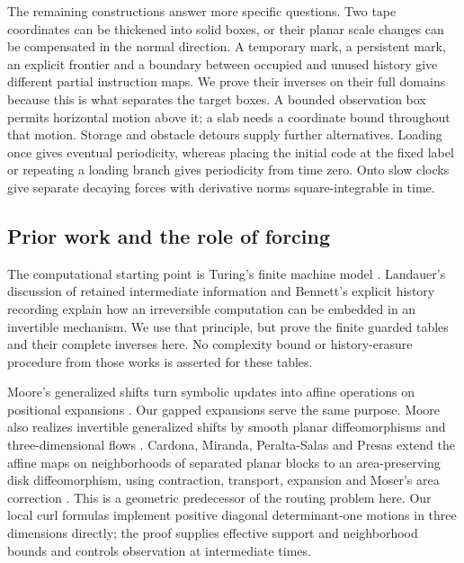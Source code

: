 The remaining constructions answer more specific questions. Two tape
coordinates can be thickened into solid boxes, or their planar scale changes
can be compensated in the normal direction. A temporary mark, a persistent
mark, an explicit frontier and a boundary between occupied and unused
history give different partial instruction maps. We prove their inverses
on their full domains because this is what separates the target boxes.
A bounded observation box permits horizontal motion above it; a slab needs
a coordinate bound throughout that motion. Storage and obstacle detours
supply further alternatives. Loading once gives eventual periodicity,
whereas placing the initial code at the fixed label or repeating a loading
branch gives periodicity from time zero. Onto slow clocks give separate
decaying forces with derivative norms square-integrable in time.

\subsection{Prior work and the role of forcing}
The computational starting point is Turing's finite machine model
\cite{Turing1936}. Landauer's discussion of retained intermediate information
\cite[Section~3]{Landauer1961} and Bennett's explicit history recording
\cite[Eqs.~(9)--(11)]{Bennett1973} explain how an irreversible computation
can be embedded in an invertible mechanism. We use that principle, but
prove the finite guarded tables and their complete inverses here. No
complexity bound or history-erasure procedure from those works is asserted
for these tables.

Moore's generalized shifts turn symbolic updates into affine operations
on positional expansions \cite{Moore1990,Moore1991}. Our gapped expansions
serve the same purpose. Moore also realizes invertible generalized shifts
by smooth planar diffeomorphisms and three-dimensional flows
\cite[Section~6, Theorem~12 and its corollary]{Moore1991}.
Cardona, Miranda, Peralta-Salas and Presas extend the affine maps on
neighborhoods of separated planar blocks to an area-preserving disk
diffeomorphism, using contraction, transport, expansion and Moser's area
correction \cite[Proposition~5.1]{CardonaMirandaPeraltaSalasPresas2021}.
This is a geometric predecessor of the routing problem here. Our local
curl formulas implement positive diagonal determinant-one motions in
three dimensions directly; the proof supplies effective support and
neighborhood bounds and controls observation at intermediate times.


